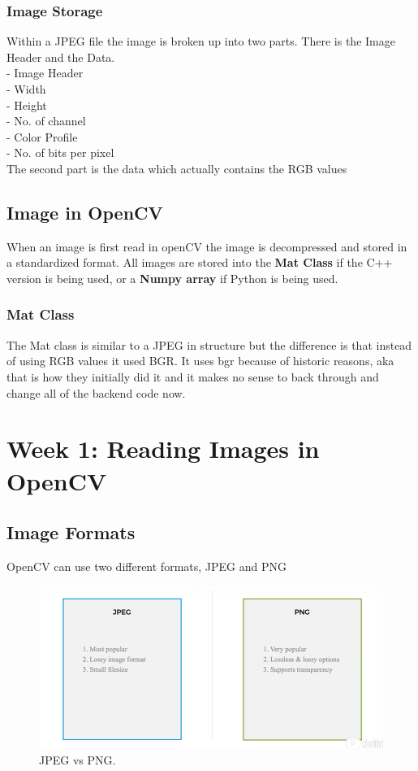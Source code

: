 \documentclass[fleqn]{article}
\begin{document}
    \subsubsection{Image Storage}
    Within a JPEG file the image is broken up into two parts. There is the Image Header and the Data.\\
    \tab - Image Header\\
    \tab\tab - Width\\
    \tab\tab - Height\\
    \tab\tab - No. of channel\\
    \tab\tab - Color Profile\\
    \tab\tab - No. of bits per pixel\\
    The second part is the data which actually contains the RGB values

    \subsection{Image in OpenCV}
    When an image is first read in openCV the image is decompressed and stored in a standardized format. All images are stored into the \textbf{Mat Class} if the C++ version is being used, or a \textbf{Numpy array} if Python is being used.

    \subsubsection{Mat Class}
    The Mat class is similar to a JPEG in structure but the difference is that instead of using RGB values it used BGR. It uses bgr because of historic reasons, aka that is how they initially did it and it makes no sense to back through and change all of the backend code now.

    \newpage
    \clearpage
    \section{Week 1: Reading Images in OpenCV}
    \subsection{Image Formats}
    OpenCV can use two different formats, JPEG and PNG

    \begin{figure}
    \centering
    \includegraphics[width=325pt]{jpegvspng.png}
    \caption{\label{fig:jpegvspng}JPEG vs PNG.}
    \end{figure}
\end{document}
